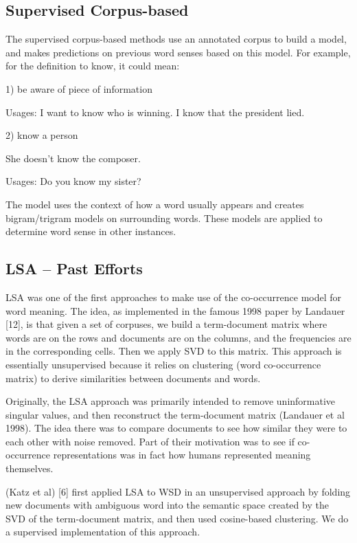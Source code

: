 \documentclass[10pt, letterpaper]{article}
\begin{document}
	\subsection{Supervised Corpus-based}
	 The supervised corpus-based methods use an annotated corpus to build a model, and makes predictions on previous word senses based on this model.  For example, for the definition to know, it could mean:
 	
 	1) be aware of piece of information
    
    Usages: I want to know who is winning.  I know that the president lied.
    
    2) know a person
    
    She doesn't know the composer.
    
    Usages: Do you know my sister?
    
    The model uses the context of how a word usually appears and creates bigram/trigram models on surrounding words.  These models are applied to determine word sense in other instances.
    
 	\subsection{LSA -- Past Efforts}
 	LSA was one of the first approaches to make use of the co-occurrence model for word meaning. The idea, as implemented in the famous 1998 paper by Landauer [12], is that given a set of corpuses, we build a term-document matrix where words are on the rows and documents are on the columns, and the frequencies are in the corresponding cells.
	Then we apply SVD to this matrix. 
	This approach is essentially unsupervised because it relies on clustering (word co-occurrence matrix) to derive similarities between documents and words. 

	Originally, the LSA approach was primarily intended to remove uninformative singular values, and then reconstruct the term-document matrix (Landauer et al 1998).  The idea there was to compare documents to see how similar they were to each other with noise removed. Part of their motivation was to see if co-occurrence representations was in fact how humans represented meaning themselves.

	(Katz et al) [6] first applied LSA to WSD in an unsupervised approach by folding new documents with ambiguous word into the semantic space created by the SVD of the term-document matrix, and then used cosine-based clustering. We do a supervised implementation of this approach. 
\end{document}
